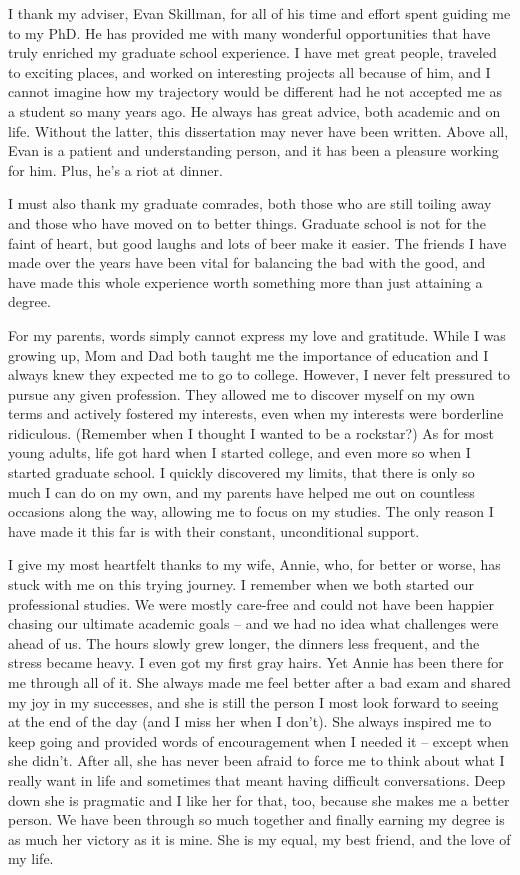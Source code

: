 I thank my adviser, Evan Skillman, for all of his time and effort spent guiding
me to my PhD. He has provided me with many wonderful opportunities that have
truly enriched my graduate school experience. I have met great people, traveled
to exciting places, and worked on interesting projects all because of him, and
I cannot imagine how my trajectory would be different had he not accepted me as
a student so many years ago. He always has great advice, both academic and on
life. Without the latter, this dissertation may never have been written. Above
all, Evan is a patient and understanding person, and it has been a pleasure
working for him. Plus, he's a riot at dinner.

I must also thank my graduate comrades, both those who are still toiling away
and those who have moved on to better things. Graduate school is not for the
faint of heart, but good laughs and lots of beer make it easier. The friends I
have made over the years have been vital for balancing the bad with the good,
and have made this whole experience worth something more than just attaining a
degree.

For my parents, words simply cannot express my love and gratitude. While I was
growing up, Mom and Dad both taught me the importance of education and I always
knew they expected me to go to college. However, I never felt pressured to
pursue any given profession. They allowed me to discover myself on my own terms
and actively fostered my interests, even when my interests were borderline
ridiculous. (Remember when I thought I wanted to be a rockstar?) As for most
young adults, life got hard when I started college, and even more so when I
started graduate school. I quickly discovered my limits, that there is only so
much I can do on my own, and my parents have helped me out on countless
occasions along the way, allowing me to focus on my studies. The only reason I
have made it this far is with their constant, unconditional support.

I give my most heartfelt thanks to my wife, Annie, who, for better or worse,
has stuck with me on this trying journey. I remember when we both started our
professional studies. We were mostly care-free and could not have been happier
chasing our ultimate academic goals -- and we had no idea what challenges were
ahead of us. The hours slowly grew longer, the dinners less frequent, and the
stress became heavy. I even got my first gray hairs. Yet Annie has been there
for me through all of it. She always made me feel better after a bad exam and
shared my joy in my successes, and she is still the person I most look forward
to seeing at the end of the day (and I miss her when I don't). She always
inspired me to keep going and provided words of encouragement when I needed it
-- except when she didn't. After all, she has never been afraid to force me to
think about what I really want in life and sometimes that meant having
difficult conversations. Deep down she is pragmatic and I like her for that,
too, because she makes me a better person. We have been through so much
together and finally earning my degree is as much her victory as it is mine.
She is my equal, my best friend, and the love of my life.
